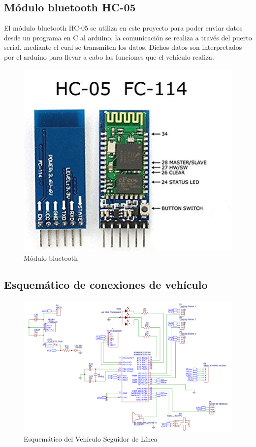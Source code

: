 \subsection{Módulo bluetooth HC-05}
El módulo bluetooth HC-05 se utiliza en este proyecto para poder enviar datos desde un programa en C al arduino, la comunicación se realiza a través del puerto serial, mediante el cual se transmiten los datos. Dichos datos son interpretados por el arduino para llevar a cabo las funciones que el vehículo realiza. 
\begin{figure}[H]
    \centering
    \includegraphics[width= 7 cm]{./imagenes/hc-05.jpg}
    \caption{Módulo bluetooth}
   
\end{figure}


\subsection{Esquemático de conexiones de vehículo}

\begin{figure}[H]
    \centering
    \includegraphics[width = 18 cm]{imagenes/schem_vehiculo.PNG}
    \caption{Esquemático del Vehículo Seguidor de Línea}
\end{figure}
